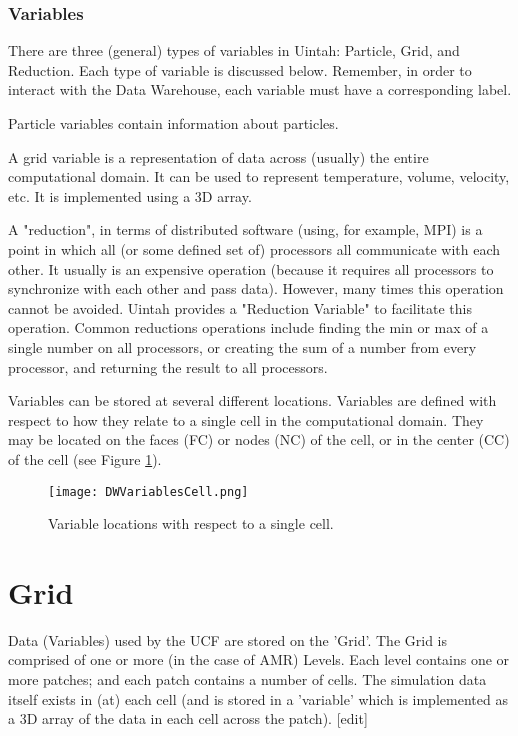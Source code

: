 \documentclass[11pt,fleqn]{book} %
\begin{document}
\subsubsection{Variables}

There are three (general) types of variables in Uintah: Particle, Grid, and Reduction. Each type of variable is discussed 
below. Remember, in order to interact with the Data Warehouse, each variable must have a corresponding label. 

Particle variables contain information about particles. 

A grid variable is a representation of data across (usually) the entire computational domain. It can be used to represent 
temperature, volume, velocity, etc. It is implemented using a 3D array. 

A "reduction", in terms of distributed software (using, for example, MPI) is a point in which all (or some defined set of) processors all communicate with each other. It usually is an expensive operation (because it requires all processors to synchronize with each other and pass data). However, many times this operation cannot be avoided. Uintah provides a "Reduction Variable" to facilitate this operation. Common reductions operations include finding the min or max of a single number on all processors, or creating the sum of a number from every processor, and returning the result to all processors. 

Variables can be stored at several different locations. Variables are defined with respect to how they relate to a single cell in the computational domain. They may be located on the faces (FC) or nodes (NC) of the cell, or in the center (CC) of the cell (see Figure \ref{Fig:DWVariablesCell}). 

\begin{figure}
  \texttt{[image: DWVariablesCell.png]}
  \caption{Variable locations with respect to a single cell.}
  \label{Fig:DWVariablesCell}
\end{figure}



\section{Grid}

Data (Variables) used by the UCF are stored on the 'Grid'. The Grid is comprised of one or more (in the case of AMR) Levels. Each level contains one or more patches; and each patch contains a number of cells. The simulation data itself exists in (at) each cell (and is stored in a 'variable' which is implemented as a 3D array of the data in each cell across the patch).
[edit] 
\end{document}

